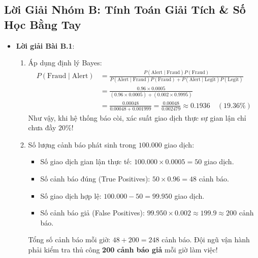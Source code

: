 \subsection{Lời Giải Nhóm B: Tính Toán Giải Tích \& Số Học Bằng Tay}
\begin{itemize}
  \item \textbf{Lời giải Bài B.1}:
  \begin{enumerate}
    \item Áp dụng định lý Bayes:
    \begin{align*}
    P(\text{Fraud} \mid \text{Alert}) &= \frac{P(\text{Alert} \mid \text{Fraud}) P(\text{Fraud})}{P(\text{Alert} \mid \text{Fraud}) P(\text{Fraud}) + P(\text{Alert} \mid \text{Legit}) P(\text{Legit})} \\
    &= \frac{0.96 \times 0.0005}{(0.96 \times 0.0005) + (0.002 \times 0.9995)} \\
    &= \frac{0.00048}{0.00048 + 0.001999} = \frac{0.00048}{0.002479} \approx \mathbf{0.1936} \quad (\mathbf{19.36\%})
    \end{align*}
    Như vậy, khi hệ thống báo còi, xác suất giao dịch thực sự gian lận chỉ chưa đầy $20\%$!
    \item Số lượng cảnh báo phát sinh trong $100.000$ giao dịch:
    \begin{itemize}
      \item Số giao dịch gian lận thực tế: $100.000 \times 0.0005 = 50$ giao dịch.
      \item Số cảnh báo đúng (True Positives): $50 \times 0.96 = 48$ cảnh báo.
      \item Số giao dịch hợp lệ: $100.000 - 50 = 99.950$ giao dịch.
      \item Số cảnh báo giả (False Positives): $99.950 \times 0.002 \approx 199.9 \approx 200$ cảnh báo.
    \end{itemize}
    Tổng số cảnh báo mỗi giờ: $48 + 200 = 248$ cảnh báo.
    Đội ngũ vận hành phải kiểm tra thủ công \textbf{200 cảnh báo giả} mỗi giờ làm việc!
  \end{enumerate}


\end{itemize}
